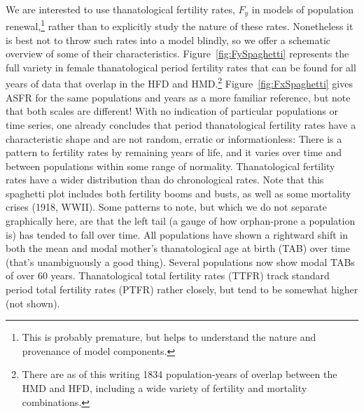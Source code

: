 \documentclass{article}
\begin{document}
We are interested to use thanatological fertility rates, $F_y$ in
models of population renewal,\footnote{This is probably premature, but helps to
understand the nature and provenance of model components.} rather than to
explicitly study the nature of these rates. Nonetheless it is best not to throw such rates into a model blindly, so we offer a schematic overview of some of their characteristics.
Figure~\ref{fig:FySpaghetti} represents the full variety in
female thanatological period fertility rates that can be found for all years
of data that overlap in the HFD and HMD.\footnote{There are as of this writing
1834 population-years of overlap between the HMD and HFD, including a wide
variety of fertility and mortality combinations.} Figure~\ref{fig:FxSpaghetti} gives ASFR for the same
populations and years as a more familiar reference, but note that both scales
are different! With no indication of particular populations or time series, one
already concludes that period thanatological fertility rates have a
characteristic shape and are not random, erratic or informationless: There is a
pattern to fertility rates by remaining years of life, and it varies over time
and between populations within some range of normality. Thanatological fertility
rates have a wider distribution than do chronological rates. Note that this
spaghetti plot includes both fertility booms and busts, as well as some
mortality crises (1918, WWII). Some patterns to note, but which we do not
separate graphically here, are that the left tail (a gauge of how orphan-prone a
population is) has tended to fall over time. All populations have shown a
rightward shift in both the mean and modal mother's thanatological age at birth
(TAB) over time (that's unambiguously a good thing). Several populations now
show modal TABs of over 60 years. Thanatological total fertility rates (TTFR)
track standard period total fertility rates (PTFR) rather closely, but tend to
be somewhat higher (not shown).
\end{document}
